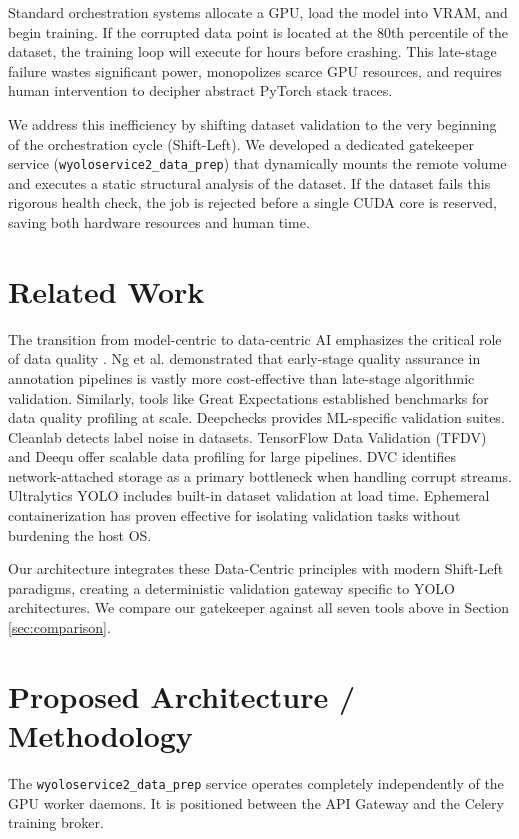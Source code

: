\documentclass[10pt,twocolumn,letterpaper]{article}
\begin{document}
Standard orchestration systems allocate a GPU, load the model into VRAM, and begin training. If the corrupted data point is located at the 80th percentile of the dataset, the training loop will execute for hours before crashing. This late-stage failure wastes significant power, monopolizes scarce GPU resources, and requires human intervention to decipher abstract PyTorch stack traces.

We address this inefficiency by shifting dataset validation to the very beginning of the orchestration cycle (Shift-Left). We developed a dedicated gatekeeper service (\texttt{wyoloservice2\_data\_prep}) that dynamically mounts the remote volume and executes a static structural analysis of the dataset. If the dataset fails this rigorous health check, the job is rejected before a single CUDA core is reserved, saving both hardware resources and human time.

\section{Related Work}
The transition from model-centric to data-centric AI emphasizes the critical role of data quality \cite{zha2023data}. Ng et al. \cite{ng2021data} demonstrated that early-stage quality assurance in annotation pipelines is vastly more cost-effective than late-stage algorithmic validation. Similarly, tools like Great Expectations \cite{greatexpectations2023} established benchmarks for data quality profiling at scale. Deepchecks \cite{deepchecks2023} provides ML-specific validation suites. Cleanlab \cite{northcutt2021cleanlab} detects label noise in datasets. TensorFlow Data Validation (TFDV) \cite{tfdv2019} and Deequ \cite{deequ2020} offer scalable data profiling for large pipelines. DVC \cite{kuprie2022dvc} identifies network-attached storage as a primary bottleneck when handling corrupt streams. Ultralytics YOLO \cite{jocher2023ultralytics} includes built-in dataset validation at load time. Ephemeral containerization has proven effective for isolating validation tasks without burdening the host OS.

Our architecture integrates these Data-Centric principles with modern Shift-Left paradigms, creating a deterministic validation gateway specific to YOLO architectures. We compare our gatekeeper against all seven tools above in Section \ref{sec:comparison}.

\section{Proposed Architecture / Methodology}
The \texttt{wyoloservice2\_data\_prep} service operates completely independently of the GPU worker daemons. It is positioned between the API Gateway and the Celery training broker.
\end{document}
